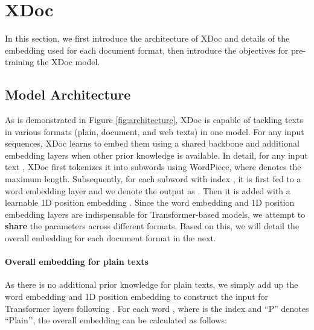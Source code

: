 \documentclass[11pt]{article}
\begin{document}
\section{XDoc}

In this section, we first introduce the architecture of XDoc and details of the embedding used for each document format, then introduce the objectives for pre-training the XDoc model.



\subsection{Model Architecture}
As is demonstrated in Figure \ref{fig:architecture}, XDoc is capable of tackling texts in various formats (plain, document, and web texts) in one model. For any input sequences, XDoc learns to embed them using a shared backbone and additional embedding layers when other prior knowledge is available. In detail, for any input text , XDoc first tokenizes it into subwords  using WordPiece, where  denotes the maximum length. Subsequently, for each subword  with index , it is first fed to a word embedding layer and we denote the output as . Then it is added with a learnable 1D position embedding . Since the word embedding and 1D position embedding layers are indispensable for Transformer-based models, we attempt to \textbf{share} the parameters across different formats. Based on this, we will detail the overall embedding for each document format in the next.

\paragraph{Overall embedding for plain texts} As there is no additional prior knowledge for plain texts, we simply add up the word embedding and 1D position embedding to construct the input for Transformer layers following \cite{devlin2018bert,liu2019roberta}. For each word , where  is the index and ``P'' denotes ``Plain’’, the overall embedding  can be calculated as follows:
\end{document}

